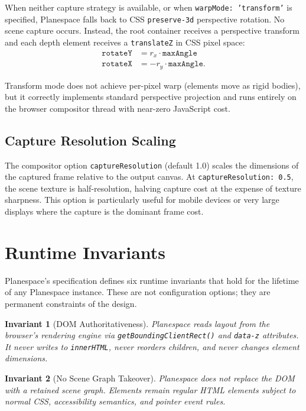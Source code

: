 \documentclass[10pt,twocolumn]{article}
\newtheorem{invariant}{Invariant}
\newcommand{\rx}{r_x}
\newcommand{\ry}{r_y}
\begin{document}
When neither capture strategy is available, or when \texttt{warpMode: 'transform'}
is specified, Planespace falls back to CSS \texttt{preserve-3d} perspective
rotation. No scene capture occurs. Instead, the root container receives a
perspective transform and each depth element receives a \texttt{translateZ}
in CSS pixel space:
\begin{align}
  \mathtt{rotateY} &= \rx \cdot \mathtt{maxAngle} \\
  \mathtt{rotateX} &= -\ry \cdot \mathtt{maxAngle}.
  \label{eq:transform}
\end{align}

Transform mode does not achieve per-pixel warp (elements move as rigid bodies),
but it correctly implements standard perspective projection and runs entirely
on the browser compositor thread with near-zero JavaScript cost.

\subsection{Capture Resolution Scaling}

The compositor option \texttt{captureResolution} (default 1.0) scales the
dimensions of the captured frame relative to the output canvas. At
\texttt{captureResolution: 0.5}, the scene texture is half-resolution,
halving capture cost at the expense of texture sharpness. This option
is particularly useful for mobile devices or very large displays where
the capture is the dominant frame cost.

\section{Runtime Invariants}
\label{sec:invariants}

Planespace's specification defines six runtime invariants that hold for
the lifetime of any Planespace instance. These are not configuration
options; they are permanent constraints of the design.

\begin{invariant}[DOM Authoritativeness]
\label{inv:dom}
Planespace reads layout from the browser's rendering engine via
\texttt{getBoundingClientRect()} and \texttt{data-z} attributes.
It never writes to \texttt{innerHTML}, never reorders children, and
never changes element dimensions.
\end{invariant}

\begin{invariant}[No Scene Graph Takeover]
\label{inv:noscenegraph}
Planespace does not replace the DOM with a retained scene graph.
Elements remain regular HTML elements subject to normal CSS, accessibility
semantics, and pointer event rules.
\end{invariant}
\end{document}
